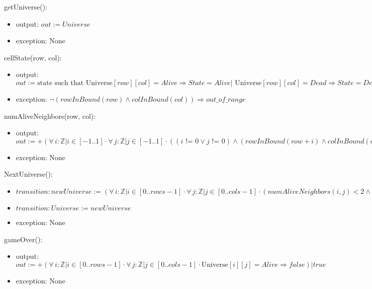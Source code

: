 \documentclass[12pt]{article}
\begin{document}
\noindent getUniverse():
\begin{itemize}
\item output: $out := Universe$

\item exception: None
\end{itemize}

\noindent cellState(row, col):
\begin{itemize}
\item output: $out := \text{state such that} \text{ Universe}[row][col] = Alive \Rightarrow State = Alive | \text{ Universe}[row][col] = Dead \Rightarrow State = Dead$

\item exception: $\lnot(rowInBound(row) \land colInBound(col)) \Rightarrow out\_of\_range$
\end{itemize}

\noindent numAliveNeighbors(row, col):
\begin{itemize}
\item output: $out := +(\forall\, i: \mathbb{Z} | i \in [-1..1] \cdot \forall\, j : \mathbb{Z} | j \in [-1..1] \cdot ((i \text{ != } 0 \lor j \text{ != } 0) \land (rowInBound(row + i) \land colInBound(col + j)) \land (cellState(i + row, j + col) = Alive)) : 1)$

\item exception: None
\end{itemize}

\noindent NextUniverse():
\begin{itemize}
\item $transition: newUniverse := (\forall\, i: \mathbb{Z} | i \in [0..rows-1] \cdot \forall\, j : \mathbb{Z} | j \in [0..cols-1] \cdot (numAliveNeighbors(i, j) < 2 \land numAliveNeighbors > 3) \Rightarrow newUniverse[i][j] = Dead | (cellState(i,j) = Dead \land numAliveNeighbors = 3) \Rightarrow newUniverse[i][j] = Alive | newUniverse[i][j] = Universe[i][j])$
\item $transition: Universe := newUniverse$ 

\item exception: None
\end{itemize}

\noindent gameOver():
\begin{itemize}
\item output: $out := +(\forall\, i: \mathbb{Z} | i \in [0..rows-1] \cdot \forall\, j : \mathbb{Z} | j \in [0..cols-1] \cdot \text{Universe}[i][j] = Alive \Rightarrow false) | true$ 

\item exception: None
\end{itemize}
\end{document}
